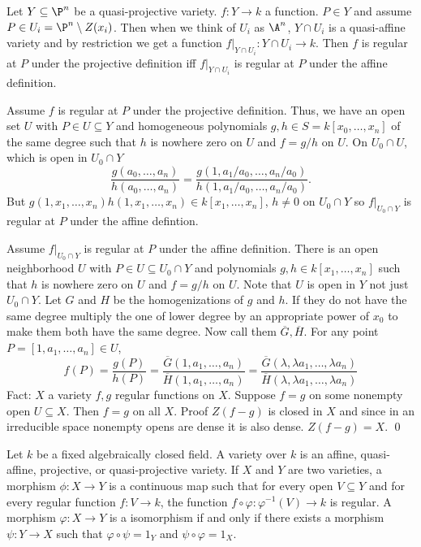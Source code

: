\begin{prop}
Let $Y \subseteq \P^n$ be a quasi-projective variety. $f: Y \to k$ a function. $P \in Y$ and assume $P \in U_i= \P^n \setminus Z(x_i)$. Then when we think of $U_i$ as $\A^n$, $Y \cap U_i$ is a quasi-affine variety and by restriction we get a function $f\big|_{Y \cap U_i}: Y \cap U_i \to k$. Then $f$ is regular at $P$ under the projective definition iff $f\big|_{Y \cap U_i}$ is regular at $P$ under the affine definition. 
\end{prop}

\pf Assume $f$ is regular at $P$ under the projective definition. Thus, we have an open set $U$ with $P \in U \subseteq Y$ and homogeneous polynomials $g,h \in S= k[x_0,\ldots,x_n]$ of the same degree such that $h$ is nowhere zero on $U$ and $f= g/h$ on $U$. On $U_0 \cap U$, which is open in $U_0 \cap Y$
	\[
	\dfrac{g(a_0,\ldots,a_n)}{h(a_0,\ldots,a_n)} = \dfrac{g(1,a_1/a_0,\ldots,a_n/a_0)}{h(1,a_1/a_0,\ldots,a_n/a_0)}.
	\]
But $g(1,x_1,\ldots,x_n) h(1,x_1,\ldots,x_n) \in k[x_1,\ldots,x_n]$, $h \neq 0$ on $U_0 \cap Y$ so $f\big|_{U_0 \cap Y}$ is regular at $P$ under the affine defintion. 

Assume $f\big|_{U_0 \cap Y}$ is regular at $P$ under the affine definition. There is an open neighborhood $U$ with $P \in U \subseteq U_0 \cap Y$ and polynomials $g,h \in k[x_1,\ldots,x_n]$ such that $h$ is nowhere zero on $U$ and $f= g/h$ on $U$. Note that $U$ is open in $Y$ not just $U_0 \cap Y$. Let $G$ and $H$ be the homogenizations of $g$ and $h$. If they do not have the same degree multiply the one of lower degree by an appropriate power of $x_0$ to make them both have the same degree. Now call them $\overline{G}, \overline{H}$. For any point $P= [1,a_1,\ldots,a_n] \in U$, 	\[
	f(P)= \dfrac{g(P)}{h(P)}= \dfrac{\overline{G}(1,a_1,\ldots,a_n)}{\overline{H}(1,a_1,\ldots,a_n)}= \dfrac{\overline{G}(\lambda, \lambda a_1,\ldots, \lambda a_n)}{\overline{H}(\lambda, \lambda a_1,\ldots, \lambda a_n)}
	\]
Fact: $X$ a variety $f,g$ regular functions on $X$. Suppose $f=g$ on some nonempty open $U \subseteq X$. Then $f=g$ on all $X$. Proof $Z(f-g)$ is closed in $X$ and since in an irreducible space nonempty opens are dense it is also dense. $Z(f-g)= X$. \qed \\


\begin{dfn}
Let $k$ be a fixed algebraically closed field. A variety over $k$ is an affine, quasi-affine, projective, or quasi-projective variety. If $X$ and $Y$ are two varieties, a morphism $\phi: X \to Y$ is a continuous map such that for every open $V \subseteq Y$ and for every regular function $f: V \to k$, the function $f \circ \varphi: \varphi^{-1}(V) \to k$ is regular. A morphism $\varphi: X  \to Y$ is a isomorphism if and only if there exists a morphism $\psi: Y \to X$ such that $\varphi \circ \psi= 1_Y$ and $\psi \circ \varphi= 1_X$. 
\end{dfn}


